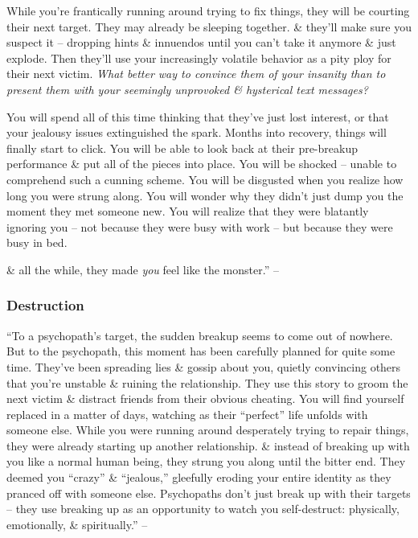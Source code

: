 \documentclass{article}
\numberwithin{equation}{section}
\begin{document}
While you're frantically running around trying to fix things, they will be courting their next target. They may already be sleeping together. \& they'll make sure you suspect it -- dropping hints \& innuendos until you can't take it anymore \& just explode. Then they'll use your increasingly volatile behavior as a pity ploy for their next victim. \textit{What better way to convince them of your insanity than to present them with your seemingly unprovoked \& hysterical text messages?}

You will spend all of this time thinking that they've just lost interest, or that your jealousy issues extinguished the spark. Months into recovery, things will finally start to click. You will be able to look back at their pre-breakup performance \& put all of the pieces into place. You will be shocked -- unable to comprehend such a cunning scheme. You will be disgusted when you realize how long you were strung along. You will wonder why they didn't just dump you the moment they met someone new. You will realize that they were blatantly ignoring you -- not because they were busy with work -- but because they were busy in bed.

\& all the while, they made \textit{you} feel like the monster.'' -- \cite[pp. 72--73]{MacKenzie2015}

\subsubsection{Destruction}
``To a psychopath's target, the sudden breakup seems to come out of nowhere. But to the psychopath, this moment has been carefully planned for quite some time. They've been spreading lies \& gossip about you, quietly convincing others that you're unstable \& ruining the relationship. They use this story to groom the next victim \& distract friends from their obvious cheating. You will find yourself replaced in a matter of days, watching as their ``perfect'' life unfolds with someone else. While you were running around desperately trying to repair things, they were already starting up another relationship. \& instead of breaking up with you like a normal human being, they strung you along until the bitter end. They deemed you ``crazy'' \& ``jealous,'' gleefully eroding your entire identity as they pranced off with someone else. Psychopaths don't just break up with their targets -- they use breaking up as an opportunity to watch you self-destruct: physically, emotionally, \& spiritually.'' -- \cite[p. 73]{MacKenzie2015}
\end{document}
